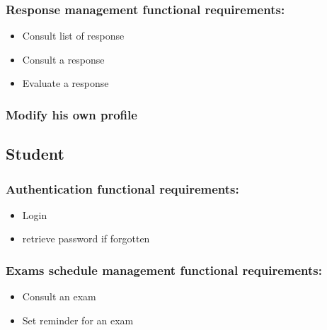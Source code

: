 \documentclass[a4paper,12p]{article}
\begin{document}
     \subsubsection{Response management functional requirements:}
     \begin{itemize}
         \item Consult list of response
         \item Consult a response
         \item Evaluate a response
     \end{itemize}

     \subsubsection{Modify his own profile}

     \subsection{Student}
     \subsubsection{Authentication functional requirements:}
     \begin{itemize}
         \item Login
         \item retrieve password if forgotten
     \end{itemize}

     \subsubsection{Exams schedule management functional requirements: }
     \begin{itemize}
         \item Consult an exam
         \item Set reminder for an exam
     \end{itemize}
\end{document}
